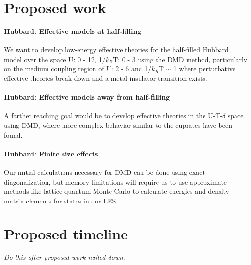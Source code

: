 \documentclass{article}
\begin{document}
\section{Proposed work}
\paragraph{Hubbard: Effective models at half-filling} We want to develop low-energy effective theories for the half-filled Hubbard model over the space U: 0 - 12, 1/$k_B$T: 0 - 3 using the DMD method, particularly on the medium coupling region of U: 2 - 6 and 1/$k_B$T $\sim$ 1 where perturbative effective theories break down and a metal-insulator transition exists.

\paragraph{Hubbard: Effective models away from half-filling} A farther reaching goal would be to develop effective theories in the U-T-$\delta$ space using DMD, where more complex behavior similar to the cuprates have been found.

\paragraph{Hubbard: Finite size effects} Our initial calculations necessary for DMD can be done using exact diagonalization, but memory limitations will require us to use approximate methods like lattice quantum Monte Carlo to calculate energies and density matrix elements for states in our LES.

\section{Proposed timeline}
\textit{Do this after proposed work nailed down}.
\end{document}
